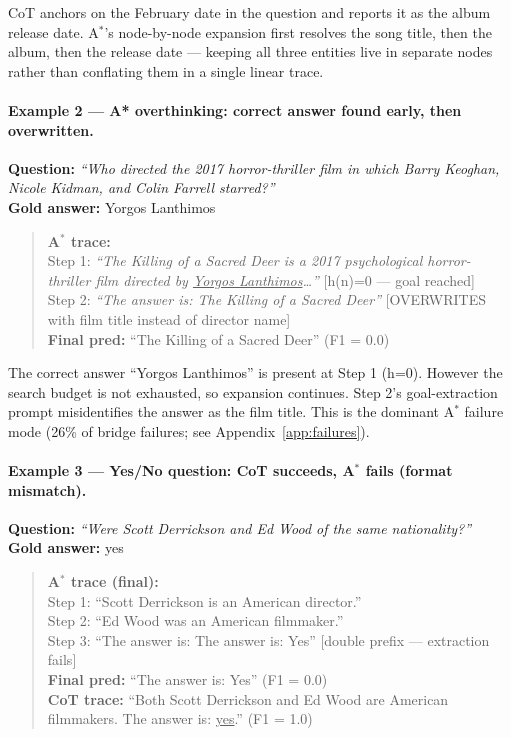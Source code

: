 \documentclass{article}
\newcommand{\astar}{A$^*$\xspace}
\begin{document}
CoT anchors on the February date in the question and reports it as the album release date. \astar's node-by-node expansion first resolves the song title, then the album, then the release date --- keeping all three entities live in separate nodes rather than conflating them in a single linear trace.

\paragraph{Example 2 --- A* overthinking: correct answer found early, then overwritten.}
\textbf{Question:} \textit{``Who directed the 2017 horror-thriller film in which Barry Keoghan, Nicole Kidman, and Colin Farrell starred?''}\\
\textbf{Gold answer:} Yorgos Lanthimos

\begin{quote}
\textbf{\astar trace:}\\
Step 1: \textit{``The Killing of a Sacred Deer is a 2017 psychological horror-thriller film directed by \underline{Yorgos Lanthimos}\ldots''} [h(n)=0 --- goal reached]\\
Step 2: \textit{``The answer is: The Killing of a Sacred Deer''} [OVERWRITES with film title instead of director name]\\
\textbf{Final pred:} ``The Killing of a Sacred Deer'' (F1 = 0.0)
\end{quote}

The correct answer ``Yorgos Lanthimos'' is present at Step 1 (h=0). However the search budget is not exhausted, so expansion continues. Step 2's goal-extraction prompt misidentifies the answer as the film title. This is the dominant \astar failure mode (26\% of bridge failures; see Appendix~\ref{app:failures}).

\paragraph{Example 3 --- Yes/No question: CoT succeeds, \astar fails (format mismatch).}
\textbf{Question:} \textit{``Were Scott Derrickson and Ed Wood of the same nationality?''}\\
\textbf{Gold answer:} yes

\begin{quote}
\textbf{\astar trace (final):}\\
Step 1: ``Scott Derrickson is an American director.''\\
Step 2: ``Ed Wood was an American filmmaker.''\\
Step 3: ``The answer is: The answer is: Yes'' [double prefix --- extraction fails]\\
\textbf{Final pred:} ``The answer is: Yes'' (F1 = 0.0)\\[4pt]
\textbf{CoT trace:} ``Both Scott Derrickson and Ed Wood are American filmmakers. The answer is: \underline{yes}.'' (F1 = 1.0)
\end{quote}
\end{document}
